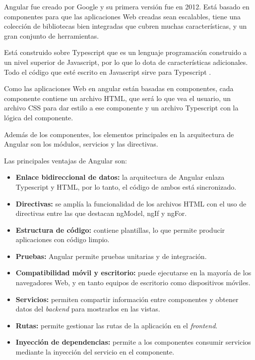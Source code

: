 Angular fue creado por Google y su primera versión fue en 2012. Está basado en componentes para que las aplicaciones Web creadas sean escalables, tiene una colección de bibliotecas bien integradas que cubren muchas características, y un gran conjunto de herramientas. 

Está construido sobre Typescript que es un lenguaje programación construido a un nivel superior de Javascript, por lo que lo dota de características adicionales. Todo el código que esté escrito en Javascript sirve para Typescript \cite{typescript}.

Como las aplicaciones Web en angular están basadas en componentes, cada componente contiene un archivo HTML, que será lo que vea el usuario, un archivo CSS para dar estilo a ese componente y un archivo Typescript con la lógica del componente.

Además de los componentes, los elementos principales en la arquitectura de Angular son los módulos, servicios y las directivas.

Las principales ventajas de Angular son:
\begin{itemize}
    \item \textbf{Enlace bidireccional de datos:}  la arquitectura de Angular enlaza Typescript y HTML, por lo tanto, el código de ambos está sincronizado.
    \item \textbf{Directivas:} se amplía la funcionalidad de los archivos HTML con el uso de directivas entre las que destacan ngModel, ngIf y ngFor. 
    \item \textbf{Estructura de código:} contiene plantillas, lo que permite producir aplicaciones con código limpio. 
    \item \textbf{Pruebas:} Angular permite pruebas unitarias y de integración.  
    \item \textbf{Compatibilidad móvil y escritorio:} puede ejecutarse en la mayoría de los navegadores Web, y en tanto equipos de escritorio como dispositivos móviles.
    \item \textbf{Servicios:} permiten compartir información entre componentes y obtener datos del \textit{backend} para mostrarlos en las vistas.
    \item \textbf{Rutas:} permite gestionar las rutas de la aplicación en el \textit{frontend}.
    \item \textbf{Inyección de dependencias:} permite a los componentes consumir servicios mediante la inyección del servicio en el componente.
\end{itemize}

